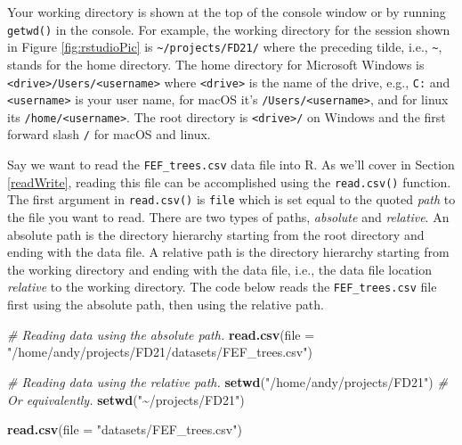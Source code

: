 \documentclass[
  11pt,
]{krantz}
\newenvironment{Shaded}{\begin{snugshade}}{\end{snugshade}}
\newcommand{\CommentTok}[1]{\textcolor[rgb]{0.56,0.35,0.01}{\textit{#1}}}
\newcommand{\DataTypeTok}[1]{\textcolor[rgb]{0.13,0.29,0.53}{#1}}
\newcommand{\KeywordTok}[1]{\textcolor[rgb]{0.13,0.29,0.53}{\textbf{#1}}}
\newcommand{\NormalTok}[1]{#1}
\newcommand{\StringTok}[1]{\textcolor[rgb]{0.31,0.60,0.02}{#1}}
\theoremstyle{definition}
\theoremstyle{definition}
\theoremstyle{definition}
\theoremstyle{definition}
\theoremstyle{remark}
\begin{document}
Your working directory is shown at the top of the console window or by running \texttt{getwd()} in the console. For example, the working directory for the session shown in Figure \ref{fig:rstudioPic} is \texttt{\textasciitilde{}/projects/FD21/} where the preceding tilde, i.e., \texttt{\textasciitilde{}}, stands for the home directory. The home directory for Microsoft Windows is \texttt{\textless{}drive\textgreater{}/Users/\textless{}username\textgreater{}} where \texttt{\textless{}drive\textgreater{}} is the name of the drive, e.g., \texttt{C:} and \texttt{\textless{}username\textgreater{}} is your user name, for macOS it's \texttt{/Users/\textless{}username\textgreater{}}, and for linux its \texttt{/home/\textless{}username\textgreater{}}. The root directory is \texttt{\textless{}drive\textgreater{}/} on Windows and the first forward slash \texttt{/} for macOS and linux.

Say we want to read the \texttt{FEF\_trees.csv} data file into R. As we'll cover in Section \ref{readWrite}, reading this file can be accomplished using the \texttt{read.csv()} function. The first argument in \texttt{read.csv()} is \texttt{file} which is set equal to the quoted \emph{path} to the file you want to read. There are two types of paths, \emph{absolute} and \emph{relative}. An absolute path is the directory hierarchy starting from the root directory and ending with the data file. A relative path is the directory hierarchy starting from the working directory and ending with the data file, i.e., the data file location \emph{relative} to the working directory. The code below reads the \texttt{FEF\_trees.csv} file first using the absolute path, then using the relative path.

\begin{Shaded}
\begin{Highlighting}[]
\CommentTok{\# Reading data using the absolute path.}
\KeywordTok{read.csv}\NormalTok{(}\DataTypeTok{file =} \StringTok{"/home/andy/projects/FD21/datasets/FEF\_trees.csv"}\NormalTok{)}

\CommentTok{\# Reading data using the relative path.}
\KeywordTok{setwd}\NormalTok{(}\StringTok{"/home/andy/projects/FD21"}\NormalTok{)}
\CommentTok{\# Or equivalently.}
\KeywordTok{setwd}\NormalTok{(}\StringTok{"\textasciitilde{}/projects/FD21"}\NormalTok{)}

\KeywordTok{read.csv}\NormalTok{(}\DataTypeTok{file =} \StringTok{"datasets/FEF\_trees.csv"}\NormalTok{)}
\end{Highlighting}
\end{Shaded}
\end{document}
